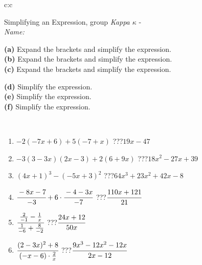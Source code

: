 \documentclass[10pt]{report}
\begin{document}
\newpage
\thispagestyle{empty}
\begin{tabular}{c:c}
\begin{minipage}[c][104.5mm][t]{0.5\linewidth}
\begin{center}
\vspace{7mm}
{\huge Simplifying an Expression, group \textit{Kappa $\kappa$} -}\\[5mm]
\textit{Name:}\phantom{xxxxxxxxxxxxxxxxxxxxxxxxxxxxxxxxxxxxxxxxxxxxxxxxxxxxxxxxxxxxxxxxx}\\[5mm]
\begin{minipage}{0.95\linewidth}
\begin{center}
{\small \begin{minipage}{0.6\textwidth}
\textbf{(a)} Expand the brackets and simplify the expression. \\[1mm]
\textbf{(b)} Expand the brackets and simplify the expression. \\[1mm]
\textbf{(c)} Expand the brackets and simplify the expression.
\end{minipage} \begin{minipage}{0.39\textwidth}
\textbf{(d)} Simplify the expression. \\[1mm]
\textbf{(e)} Simplify the expression. \\[1mm]
\textbf{(f)} Simplify the expression.
\end{minipage}
}
\end{center}
\end{minipage}
\\[4mm]
\begin{minipage}{0.79\linewidth}
\begin{center}
\begin{varwidth}{\linewidth}
\begin{enumerate}
\normalsize
\item $-2(-7x+6)+5(-7+x)$\quad \dotfill\; ???\;\dotfill \quad $19x-47$
\item $-3(3-3x)(2x-3)+2(6+9x)$\quad \dotfill\; ???\;\dotfill \quad $18x^2-27x+39$
\item $(4x+1)^3-(-5x+3)^2$\quad \dotfill\; ???\;\dotfill \quad $64x^3+23x^2+42x-8$
\item $\cfrac{-8x-7}{-3}+6\cdot\cfrac{-4-3x}{-7}$\quad \dotfill\; ???\;\dotfill \quad $\cfrac{110x+121}{21}$
\item $\cfrac{\frac{2}{-1}-\frac{1}{x}}{\frac{1}{-6}+\frac{8}{-2}}$\quad \dotfill\; ???\;\dotfill \quad $\cfrac{24x+12}{50x}$
\item $\cfrac{(2-3x)^2+8}{(-x-6)\cdot\frac{2}{x}}$\quad \dotfill\; ???\;\dotfill \quad $\cfrac{9x^3-12x^2-12x}{2x-12}$

\end{enumerate}
\end{varwidth}
\end{center}
\end{minipage}
\end{center}
\end{minipage}
\end{tabular}
\end{document}
